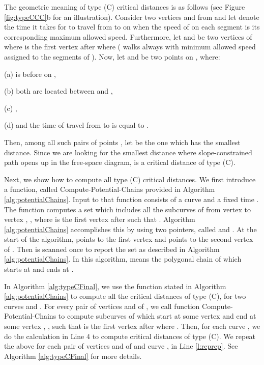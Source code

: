 \documentclass[12pt]{dalthesis}
\begin{document}
The geometric meaning of type (C) critical distances is as follows
(see Figure \ref{fig:typeCCC}b for an illustration).
Consider two vertices  and  from  and
let  denote the time it takes for 
to travel from  to  on  when the speed of  on each 
segment is its corresponding maximum allowed speed.
Furthermore, let  and 
be two vertices of  where 
 is the first vertex after 
where  ( walks always 
with minimum allowed speed assigned to the segments of ).
Now, let  and   be two points on ,
where: 

(a)  is before  on ,

(b) both are located between  and ,

(c) ,

(d) and the time of travel from  to  is equal to . 

Then, among all such pairs of points , 
let  be the one which has the smallest distance. Since we are looking for the smallest distance where 
slope-constrained path opens up in the free-space diagram, 
 is a critical distance of type (C).


Next, we show how to compute all type (C) critical distances.
We first introduce a function, called {\sc Compute-Potential-Chains}
provided in Algorithm \ref{alg:potentialChains}.
Input to that function consists of a curve  and a fixed time .
The function computes a set  which includes all 
the subcurves of  from vertex  to vertex , , where  
is the first vertex after  such that .
Algorithm \ref{alg:potentialChains} accomplishes this by using two pointers, 
called  and 
. At the start of the algorithm,  points to the 
first vertex and  points to the second vertex of . 
Then  is scanned once to report the set  as described in 
Algorithm \ref{alg:potentialChains}.
In this algorithm,  means the polygonal chain 
of  which starts at  and ends at .


In Algorithm \ref{alg:typeCFinal}, we use the function stated 
in Algorithm \ref{alg:potentialChains}
to compute all the critical distances of type (C), 
for two curves  and . 
For every pair of vertices  and  of ,
we call function {\sc Compute-Potential-Chains} 
to compute subcurves  of  which start
at some vertex  and end at some vertex ,
, such that  is the first vertex 
after  where .
Then, for each curve , 
we do the calculation in Line 4 to compute critical distances of type (C).
We repeat the above for each pair of vertices  and  of 
and curve , in Line \ref{l:reprep}.
See Algorithm \ref{alg:typeCFinal} for more details.
\end{document}
